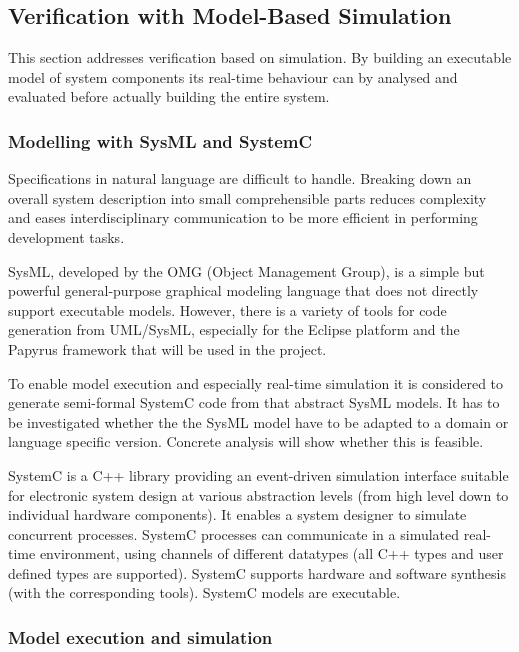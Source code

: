 \documentclass{template/openetcs_report}
\begin{document}

\subsection{Verification with Model-Based Simulation}
\label{sct:uro:systemc}


This section addresses verification based on simulation. By building an executable model of system components its real-time behaviour can by analysed and evaluated before actually building the entire system.

\subsubsection{Modelling with SysML and SystemC}

Specifications in natural language are difficult to handle. Breaking down an overall system description into small comprehensible parts reduces complexity and eases interdisciplinary communication to be more efficient in performing development tasks.

SysML, developed by the OMG (Object Management Group), is a simple but powerful general-purpose graphical modeling language that does not directly support executable models. However, there is a variety of tools for code generation from UML/SysML, especially for the Eclipse platform and the Papyrus framework that will be used in the project.

To enable model execution and especially real-time simulation it is considered to generate semi-formal SystemC code from that abstract SysML models. It has to be investigated whether the the SysML model have to be adapted to a domain or language specific version. Concrete analysis will show whether this is feasible.

SystemC is a C++ library providing an event-driven simulation interface suitable for electronic system design at various abstraction levels (from high level down to individual hardware components). It enables a system designer to simulate concurrent processes. SystemC processes can communicate in a simulated real-time environment, using channels of different datatypes (all C++ types and user defined types are supported). SystemC supports hardware and software synthesis (with the corresponding tools). SystemC models are executable.

\subsubsection{Model execution and simulation}
\end{document}
